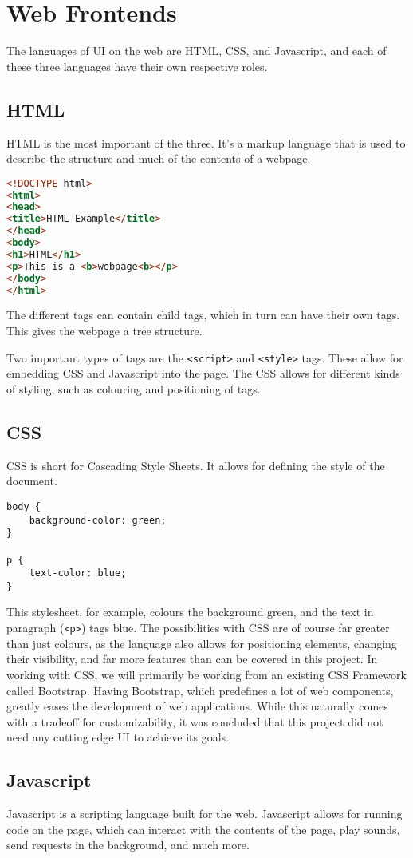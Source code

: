 \section{Web Frontends}
The languages of UI on the web are HTML, CSS, and Javascript, and each of these three languages have their own respective roles.\cite{nixonweb}
\subsection{HTML}
HTML is the most important of the three.
It's a markup language that is used to describe the structure and much of the contents of a webpage.
\begin{lstlisting}[language=HTML]
<!DOCTYPE html>
<html>
<head>
<title>HTML Example</title>
</head>
<body>
<h1>HTML</h1>
<p>This is a <b>webpage<b></p>
</body>
</html>
\end{lstlisting}
The different tags can contain child tags, which in turn can have their own tags.
This gives the webpage a tree structure.

Two important types of tags are the \texttt{<script>} and \texttt{<style>} tags.
These allow for embedding CSS and Javascript into the page.
The CSS allows for different kinds of styling, such as colouring and positioning of tags.
\subsection{CSS}
CSS is short for Cascading Style Sheets. It allows for defining the style of the document.
\begin{lstlisting}
body {
	background-color: green;
}

p {
	text-color: blue;
}
\end{lstlisting}
This stylesheet, for example, colours the background green, and the text in paragraph (\texttt{<p>}) tags blue. The possibilities with CSS are of course far greater than just colours, as the language also allows for positioning elements, changing their visibility, and far more features than can be covered in this project.\cite{nixonweb}
In working with CSS, we will primarily be working from an existing CSS Framework called Bootstrap. Having Bootstrap, which predefines a lot of web components, greatly eases the development of web applications. While this naturally comes with a tradeoff for customizability, it was concluded that this project did not need any cutting edge UI to achieve its goals.
\subsection{Javascript}
Javascript is a scripting language built for the web.
Javascript allows for running code on the page, which can interact with the contents of the page, play sounds, send requests in the background, and much more.\cite{nixonweb}
